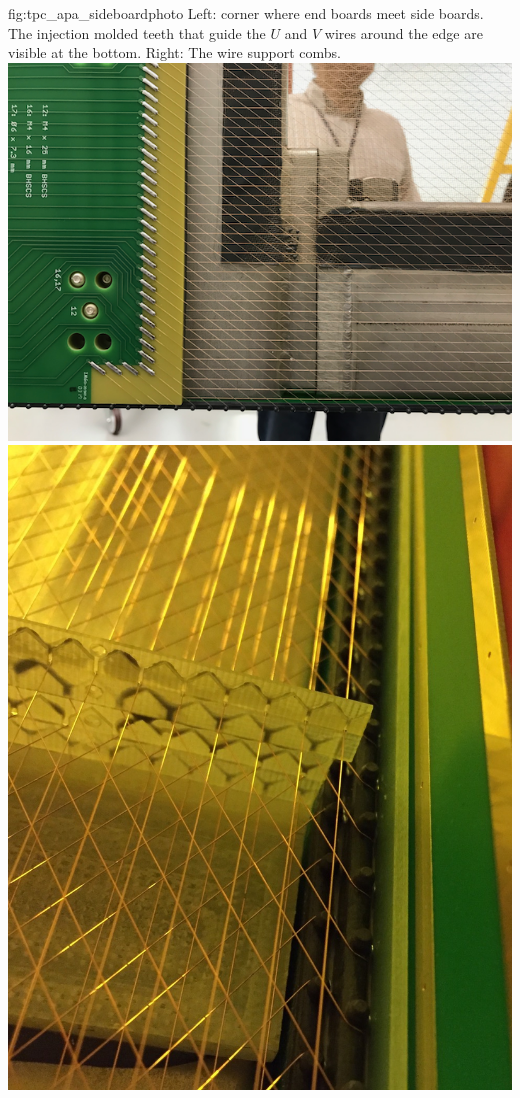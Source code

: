\begin{dunefigure}{fig:tpc_apa_sideboardphoto}
{Left:  corner where end boards meet side boards.  The injection molded teeth that guide the $U$ and $V$ wires around the edge are visible at the bottom. Right: The wire support combs.}
\includegraphics[height=0.32\textheight]{graphics/sp-apa-boards-with-pins.png} \quad
\includegraphics[height=0.32\textheight]{graphics/sp-apa-photo-combs.jpg}
\end{dunefigure}

